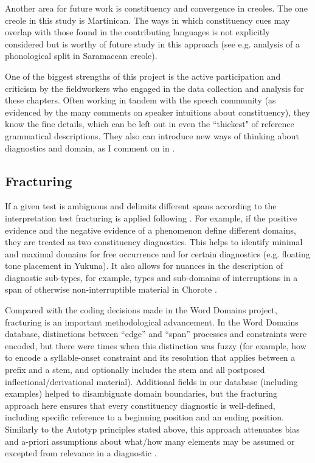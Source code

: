 \documentclass[output=paper]{langscibook}
\begin{document}
Another area for future work is constituency and convergence in creoles. The one creole in this study is Martinican. The ways in which constituency cues may overlap with those found in the contributing languages is not explicitly considered but is worthy of future study in this approach (see e.g. \citealt{good_tone_2004} analysis of a phonological split in Saramaccan creole).

One of the biggest strengths of this project is the active participation and criticism by the fieldworkers who engaged in the data collection and analysis for these chapters. Often working in tandem with the speech community (as evidenced by the many comments on speaker intuitions about constituency), they know the fine details, which can be left out in even the ``thickest" of reference grammatical descriptions. They also can introduce new ways of thinking about diagnostics and domain, as I comment on in .

\subsection{Fracturing}
\label{sec:KH:fracturing}

If a given test is ambiguous and delimits different spans according to the interpretation test fracturing is applied following \citet{Tallman2021}. For example, if the positive evidence and the negative evidence of a phenomenon define different domains, they are treated as two constituency diagnostics. This helps to identify minimal and maximal domains for free occurrence and for certain diagnostics (e.g. floating tone placement in Yukuna). It also allows for nuances in the description of diagnostic sub-types, for example, types and sub-domains of interruptions in a span of otherwise non-interruptible material in Chorote .

Compared with the coding decisions made in the Word Domains project, fracturing is an important methodological advancement. In the Word Domains data\-base, distinctions between “edge” and “span” processes and constraints were encoded, but there were times when this distinction was fuzzy (for example, how to encode a syllable-onset constraint and its resolution that applies between a prefix and a stem, and optionally includes the stem and all postposed inflectional{\slash}derivational material). Additional fields in our database (including examples) helped to disambiguate domain boundaries, but the fracturing approach here ensures that every constituency diagnostic is well-defined, including specific reference to a beginning position and an ending position. Similarly to the Autotyp principles stated above, this approach attenuates bias and a-priori assumptions about what/how many elements may be assumed or excepted from relevance in a diagnostic \citep{Tallman2021}.
\end{document}

